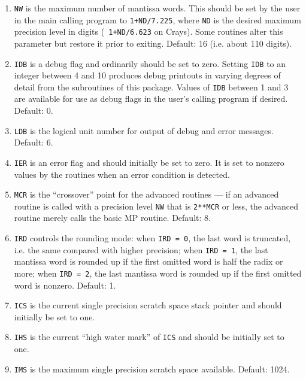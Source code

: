 \begin{enumerate}

\item {\tt NW} is the maximum number of mantissa words.  This should
be set by the user in the main calling program to {\tt 1+ND/7.225},
where {\tt ND} is the desired maximum precision level in digits ({\tt
1+ND/6.623} on Crays).  Some routines alter this parameter but
restore it prior to exiting.  Default: 16 (i.e. about 110 digits).

\item {\tt IDB} is a debug flag and ordinarily should be set to zero.
Setting {\tt IDB} to an integer between 4 and 10 produces debug
printouts in varying degrees of detail from the subroutines of this
package.  Values of {\tt IDB} between 1 and 3 are available for use as
debug flags in the user's calling program if desired.  Default: 0.

\item {\tt LDB} is the logical unit number for output of debug and
error messages.  Default: 6.

\item {\tt IER} is an error flag and should initially be set to zero.
It is set to nonzero values by the routines when an error condition is
detected.

\item {\tt MCR} is the ``crossover'' point for the advanced routines
--- if an advanced routine is called with a precision level {\tt NW}
that is {\tt 2**MCR} or less, the advanced routine merely calls the
basic MP routine.  Default: 8.

\item {\tt IRD} controls the rounding mode: when {\tt IRD = 0}, the
last word is truncated, i.e. the same compared with higher precision;
when {\tt IRD = 1}, the last mantissa word is rounded up if the first
omitted word is half the radix or more; when {\tt IRD = 2}, the last
mantissa word is rounded up if the first omitted word is nonzero.
Default: 1.

\item {\tt ICS} is the current single precision scratch space stack
pointer and should initially be set to one.

\item {\tt IHS} is the current ``high water mark'' of {\tt ICS} and
should be initially set to one. 

\item {\tt IMS} is the maximum single precision scratch space
available.  Default: 1024. 

\end{enumerate}

